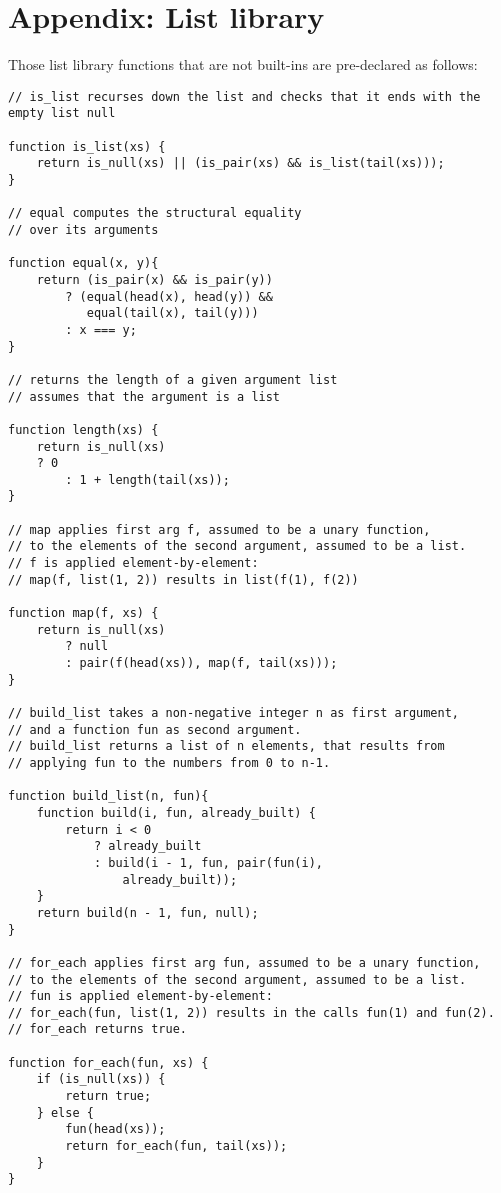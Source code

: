 \section*{Appendix: List library}

Those list library functions that are not built-ins are pre-declared as follows:

\begin{lstlisting}
// is_list recurses down the list and checks that it ends with the empty list null

function is_list(xs) {
    return is_null(xs) || (is_pair(xs) && is_list(tail(xs)));
}

// equal computes the structural equality 
// over its arguments

function equal(x, y){
    return (is_pair(x) && is_pair(y)) 
        ? (equal(head(x), head(y)) &&
           equal(tail(x), tail(y)))
        : x === y;
}

// returns the length of a given argument list
// assumes that the argument is a list

function length(xs) {
    return is_null(xs) 
	? 0
        : 1 + length(tail(xs));
}

// map applies first arg f, assumed to be a unary function,
// to the elements of the second argument, assumed to be a list.
// f is applied element-by-element: 
// map(f, list(1, 2)) results in list(f(1), f(2))

function map(f, xs) {
    return is_null(xs)
        ? null
        : pair(f(head(xs)), map(f, tail(xs)));
}

// build_list takes a non-negative integer n as first argument,
// and a function fun as second argument.
// build_list returns a list of n elements, that results from 
// applying fun to the numbers from 0 to n-1.

function build_list(n, fun){
    function build(i, fun, already_built) {
        return i < 0
            ? already_built
            : build(i - 1, fun, pair(fun(i),
                already_built));
    }
    return build(n - 1, fun, null);
}

// for_each applies first arg fun, assumed to be a unary function,
// to the elements of the second argument, assumed to be a list.
// fun is applied element-by-element:
// for_each(fun, list(1, 2)) results in the calls fun(1) and fun(2).
// for_each returns true.

function for_each(fun, xs) {
    if (is_null(xs)) {
        return true;
    } else {
        fun(head(xs));
        return for_each(fun, tail(xs));
    }
}


\end{lstlisting}
